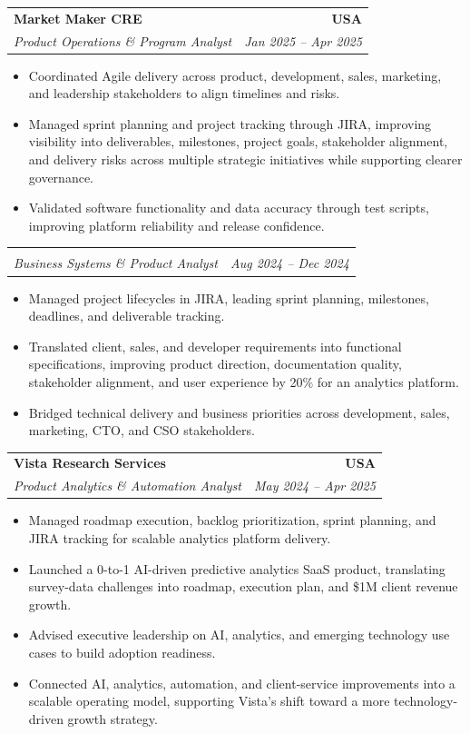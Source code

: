 \documentclass[letterpaper,10pt]{article}
\makeatletter
\newcommand{\resumeItem}[1]{\item \small{#1}}
\newcommand{\resumeSubheading}[4]{
  \vspace{1pt}\item
    \begin{tabular*}{1.0\textwidth}[t]{l@{\extracolsep{\fill}}r}
      \textbf{#1} & \textbf{\small #2} \\
      \textit{\small #3} & \textit{\small #4} \\
    \end{tabular*}\vspace{-6pt}
}
\newcommand{\resumeItemListStart}{\begin{itemize}[leftmargin=0.15in, itemsep=1pt, topsep=3pt]}
\newcommand{\resumeItemListEnd}{\end{itemize}\vspace{-2pt}}
\makeatother
\begin{document}
\vspace{-2pt}

\resumeSubheading
{Market Maker CRE}{USA}
{Product Operations \& Program Analyst}{Jan 2025 -- Apr 2025}
\resumeItemListStart
\resumeItem{Coordinated Agile delivery across product, development, sales, marketing, and leadership stakeholders to align timelines and risks.}
\resumeItem{Managed sprint planning and project tracking through JIRA, improving visibility into deliverables, milestones, project goals, stakeholder alignment, and delivery risks across multiple strategic initiatives while supporting clearer governance.}
\resumeItem{Validated software functionality and data accuracy through test scripts, improving platform reliability and release confidence.}
\resumeItemListEnd

\vspace{-2pt}

\resumeSubheading
{}{}
{Business Systems \& Product Analyst}{Aug 2024 -- Dec 2024}
\resumeItemListStart
\resumeItem{Managed project lifecycles in JIRA, leading sprint planning, milestones, deadlines, and deliverable tracking.}
\resumeItem{Translated client, sales, and developer requirements into functional specifications, improving product direction, documentation quality, stakeholder alignment, and user experience by 20\% for an analytics platform.}
\resumeItem{Bridged technical delivery and business priorities across development, sales, marketing, CTO, and CSO stakeholders.}
\resumeItemListEnd

\vspace{-2pt}

\resumeSubheading
{Vista Research Services}{USA}
{Product Analytics \& Automation Analyst}{May 2024 -- Apr 2025}
\resumeItemListStart
\resumeItem{Managed roadmap execution, backlog prioritization, sprint planning, and JIRA tracking for scalable analytics platform delivery.}
\resumeItem{Launched a 0-to-1 AI-driven predictive analytics SaaS product, translating survey-data challenges into roadmap, execution plan, and \$1M client revenue growth.}
\resumeItem{Advised executive leadership on AI, analytics, and emerging technology use cases to build adoption readiness.}
\resumeItem{Connected AI, analytics, automation, and client-service improvements into a scalable operating model, supporting Vista’s shift toward a more technology-driven growth strategy.}
\resumeItemListEnd

\vspace{-2pt}
\end{document}
